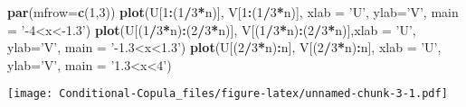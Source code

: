\documentclass[]{article}
\newenvironment{Shaded}{\begin{snugshade}}{\end{snugshade}}
\newcommand{\KeywordTok}[1]{\textcolor[rgb]{0.13,0.29,0.53}{\textbf{#1}}}
\newcommand{\DataTypeTok}[1]{\textcolor[rgb]{0.13,0.29,0.53}{#1}}
\newcommand{\DecValTok}[1]{\textcolor[rgb]{0.00,0.00,0.81}{#1}}
\newcommand{\StringTok}[1]{\textcolor[rgb]{0.31,0.60,0.02}{#1}}
\newcommand{\OperatorTok}[1]{\textcolor[rgb]{0.81,0.36,0.00}{\textbf{#1}}}
\newcommand{\NormalTok}[1]{#1}
\begin{document}
\begin{Shaded}
\begin{Highlighting}[]
\KeywordTok{par}\NormalTok{(}\DataTypeTok{mfrow=}\KeywordTok{c}\NormalTok{(}\DecValTok{1}\NormalTok{,}\DecValTok{3}\NormalTok{))}
\KeywordTok{plot}\NormalTok{(U[}\DecValTok{1}\OperatorTok{:}\NormalTok{(}\DecValTok{1}\OperatorTok{/}\DecValTok{3}\OperatorTok{*}\NormalTok{n)], V[}\DecValTok{1}\OperatorTok{:}\NormalTok{(}\DecValTok{1}\OperatorTok{/}\DecValTok{3}\OperatorTok{*}\NormalTok{n)], }\DataTypeTok{xlab =} \StringTok{'U'}\NormalTok{, }\DataTypeTok{ylab=}\StringTok{'V'}\NormalTok{, }\DataTypeTok{main =} \StringTok{'-4<x<-1.3'}\NormalTok{)}
\KeywordTok{plot}\NormalTok{(U[(}\DecValTok{1}\OperatorTok{/}\DecValTok{3}\OperatorTok{*}\NormalTok{n)}\OperatorTok{:}\NormalTok{(}\DecValTok{2}\OperatorTok{/}\DecValTok{3}\OperatorTok{*}\NormalTok{n)], V[(}\DecValTok{1}\OperatorTok{/}\DecValTok{3}\OperatorTok{*}\NormalTok{n)}\OperatorTok{:}\NormalTok{(}\DecValTok{2}\OperatorTok{/}\DecValTok{3}\OperatorTok{*}\NormalTok{n)],}\DataTypeTok{xlab =} \StringTok{'U'}\NormalTok{, }\DataTypeTok{ylab=}\StringTok{'V'}\NormalTok{, }\DataTypeTok{main =} \StringTok{'-1.3<x<1.3'}\NormalTok{)}
\KeywordTok{plot}\NormalTok{(U[(}\DecValTok{2}\OperatorTok{/}\DecValTok{3}\OperatorTok{*}\NormalTok{n)}\OperatorTok{:}\NormalTok{n], V[(}\DecValTok{2}\OperatorTok{/}\DecValTok{3}\OperatorTok{*}\NormalTok{n)}\OperatorTok{:}\NormalTok{n], }\DataTypeTok{xlab =} \StringTok{'U'}\NormalTok{, }\DataTypeTok{ylab=}\StringTok{'V'}\NormalTok{, }\DataTypeTok{main =} \StringTok{'1.3<x<4'}\NormalTok{)}
\end{Highlighting}
\end{Shaded}

\texttt{[image: Conditional-Copula\_files/figure-latex/unnamed-chunk-3-1.pdf]}
\end{document}

